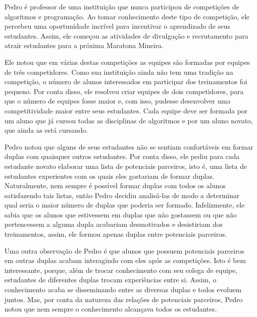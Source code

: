 %

Pedro é professor de uma instituição que nunca participou de competições de algoritmos e programação. Ao tomar conhecimento deste tipo de competição,
ele percebeu uma oportunidade incrível para incentivar o aprendizado de seus estudantes. Assim, ele começou as atividades de divulgação e recrutamento
para atrair estudantes para a próxima Maratona Mineira.

Ele notou que em várias destas competições as equipes são formadas por equipes de três competidores. Como sua instituição ainda não tem uma tradição
na competição, o número de alunos interessados em participar dos treinamentos foi pequeno. Por conta disso, ele resolveu criar equipes de dois
competidores, para que o número de equipes fosse maior e, com isso, pudesse desenvolver uma competitividade maior entre seus estudantes.
Cada equipe deve ser formada por um aluno que já cursou todas as disciplinas de algoritmos e por um aluno novato, que ainda as está cursando.

Pedro notou que alguns de seus estudantes não se sentiam confortáveis em formar duplas com quaisquer outros estudantes. Por conta disso, ele pediu
para cada estudante novato elaborar uma lista de potenciais parceiros, isto é, uma lista de estudantes experientes com os quais eles gostariam
de formar duplas.
Naturalmente, nem sempre é possível formar duplas com todos os alunos satisfazendo tais listas, então Pedro decidiu analisá-las de modo a determinar
qual seria o maior número de duplas que poderia ser formado.
Infelizmente, ele sabia que os alunos que estivessem em duplas que não gostassem ou que não pertencessem a alguma dupla acabariam desmotivados e
desistiriam dos treinamentos, assim, ele formou apenas duplas entre potenciais parceiros.

Uma outra observação de Pedro é que alunos que possuem potenciais parceiros em outras duplas acabam interagindo com eles após as competições.
Isto é bem interessante, porque, além de trocar conhecimento com seu colega de equipe, estudantes de diferentes duplas trocam experiências entre si.
Assim, o conhecimento acaba se disseminando entre as diversas duplas e todos evoluem juntos. Mas, por conta da natureza das relações de potenciais
parceiros, Pedro notou que nem sempre o conhecimento alcançava todos os estudantes.

